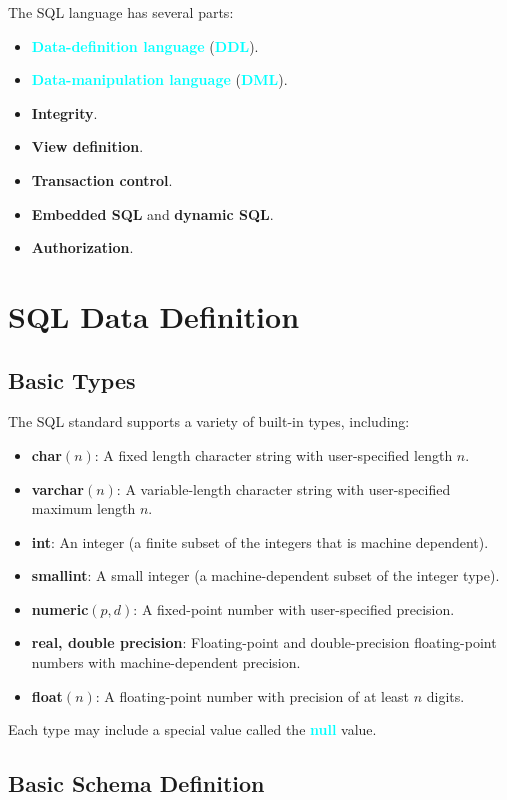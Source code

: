 \documentclass{Beautybook-EN}
\newcommand{\textcy}[1]{\textbf{\textcolor{cyan}{#1}}}
\begin{document}
The SQL language has several parts:
\begin{itemize}
    \item\textcy{Data-definition language} (\textcy{DDL}).
    \item\textcy{Data-manipulation language} (\textcy{DML}).
    \item\textbf{Integrity}.
    \item\textbf{View definition}.
    \item\textbf{Transaction control}.
    \item\textbf{Embedded SQL} and \textbf{dynamic SQL}.
    \item\textbf{Authorization}.
\end{itemize}

\section{SQL Data Definition}
\subsection{Basic Types}

The SQL standard supports a variety of built-in types, including:
\begin{itemize}
    \item\textbf{char}$(n)$: A fixed length character string with user-specified length $n$.
    \item\textbf{varchar}$(n)$: A variable-length character string with user-specified maximum length $n$.
    \item\textbf{int}: An integer (a finite subset of the integers that is machine dependent).
    \item\textbf{smallint}: A small integer (a machine-dependent subset of the integer type).
    \item\textbf{numeric}$(p,d)$: A fixed-point number with user-specified precision.
    \item\textbf{real, double precision}: Floating-point and double-precision floating-point numbers with machine-dependent precision.
    \item\textbf{float}$(n)$: A floating-point number with precision of at least $n$ digits.
\end{itemize}

Each type may include a special value called the \textcy{null} value.

\subsection{Basic Schema Definition}
\end{document}
